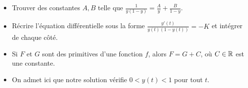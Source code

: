 \documentclass[11pt,class=report,crop=false]{standalone}
\begin{document}
\indication
\sauteligne
\begin{itemize}
  \item Trouver des constantes $ A, B $ telle que 
	$\frac{1}{y(1-y)} = \frac{A}{y} + \frac{B}{1 - y}$.
  \item Récrire l'équation différentielle sous la forme $\frac{y'(t)}{y(t)(1-y(t))}=-K$ et intégrer de chaque côté.
  \item Si $ F $ et $ G $ sont des primitives d'une fonction $ f $, alors 
$ F = G + C $, où $ C \in \mathbb{R} $ est une constante. 
  \item On admet ici que notre solution vérifie $0<y(t)<1$ pour tout $t$.
\end{itemize}
\finindication

\correction

\end{document}
